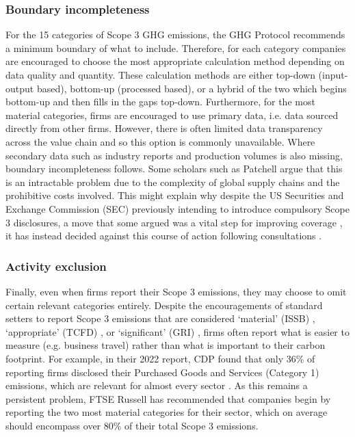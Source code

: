 \documentclass[12pt,twoside]{report}
\begin{document}
\subsubsection{Boundary incompleteness}

For the 15 categories of Scope 3 GHG emissions, the GHG Protocol recommends a minimum boundary of what to include. Therefore, for each category companies are encouraged to choose the most appropriate calculation method depending on data quality and quantity. These calculation methods are either top-down (input-output based), bottom-up (processed based), or a hybrid of the two which begins bottom-up and then fills in the gaps top-down. Furthermore, for the most material categories, firms are encouraged to use primary data, i.e. data sourced directly from other firms. However, there is often limited data transparency across the value chain and so this option is commonly unavailable. Where secondary data such as industry reports and production volumes is also missing, boundary incompleteness follows. Some scholars such as Patchell \cite{patchell2018} argue that this is an intractable problem due to the complexity of global supply chains and the prohibitive costs involved. This might explain why despite the US Securities and Exchange Commission (SEC) previously intending to introduce compulsory Scope 3 disclosures, a move that some argued was a vital step for improving coverage \cite{lgim2023}, it has instead decided against this course of action following consultations \cite{sec2024}.

\subsubsection{Activity exclusion}

Finally, even when firms report their Scope 3 emissions, they may choose to omit certain relevant categories entirely. Despite the encouragements of standard setters to report Scope 3 emissions that are considered `material' (ISSB) \cite{ifrs2023}, `appropriate' (TCFD) \cite{tcfd2021}, or `significant' (GRI) \cite{gri2016},  firms often report what is easier to measure (e.g. business travel) rather than what is important to their carbon footprint. For example, in their 2022 report, CDP found that only 36\% of reporting firms disclosed their Purchased Goods and Services (Category 1) emissions, which are relevant for almost every sector \cite{cdp2022}. As this remains a persistent problem, FTSE Russell \cite{ftserussell2024} has recommended that companies begin by reporting the two most material categories for their sector, which on average should encompass over 80\% of their total Scope 3 emissions. 
\end{document}

